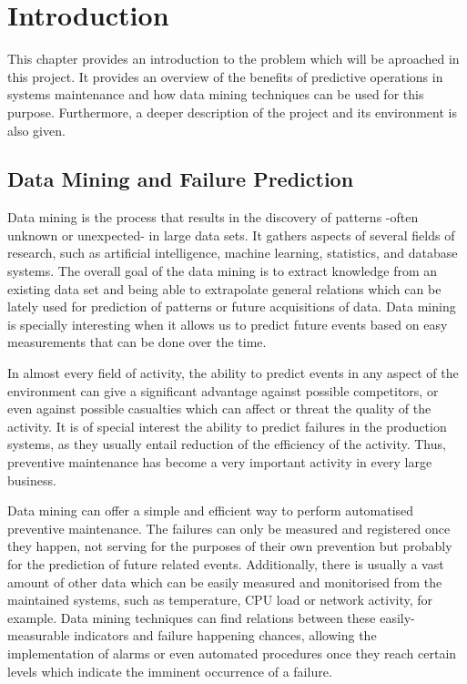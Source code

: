 \chapter{Introduction}
\begin{chapterintro}
 This chapter provides an introduction to the problem which will be aproached in this project. It provides an overview of the benefits of predictive operations in systems maintenance and how data mining techniques can be used for this purpose. Furthermore, a deeper description of the project and its environment is also given.
\end{chapterintro}
\section{Data Mining and Failure Prediction}
\label{sec:about_data_mining}Data mining is the process that results in the discovery of patterns -often unknown or unexpected- in large data sets. It gathers aspects of several fields of research, such as artificial intelligence, machine learning, statistics, and database systems. The overall goal of the data mining is to extract knowledge from an existing data set and being able to extrapolate general relations which can be lately used for prediction of patterns or future acquisitions of data. Data mining is specially interesting when it allows us to predict future events based on easy measurements that can be done over the time.

In almost every field of activity, the ability to predict events in any aspect of the environment can give a significant advantage against possible competitors, or even against possible casualties which can affect or threat the quality of the activity. It is of special interest the ability to predict failures in the production systems, as they usually entail reduction of the efficiency of the activity. Thus, preventive maintenance has become a very important activity in every large business.

Data mining can offer a simple and efficient way to perform automatised preventive maintenance. The failures can only be measured and registered once they happen, not serving for the purposes of their own prevention but probably for the prediction of future related events. Additionally, there is usually a vast amount of other data which can be easily measured and monitorised from the maintained systems, such as temperature, CPU load or network activity, for example. Data mining techniques can find relations between these easily-measurable indicators and failure happening chances, allowing the implementation of alarms or even automated procedures once they reach certain levels which indicate the imminent occurrence of a failure.

